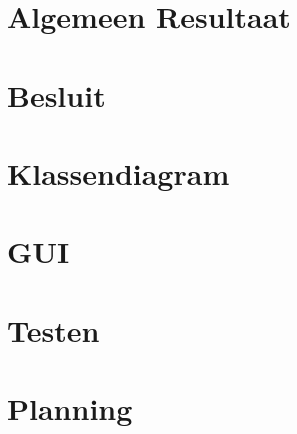 \documentclass[eind]{penoverslag}
\begin{document}
\section{Algemeen Resultaat}
\label{sec:AlgemeenResultaat}



\section*{Besluit}
\label{sec:Besluit}






\newpage\makeappendix

\section{Klassendiagram}
\label{App: AppendixKlassendiagram}

\newpage
\section{GUI}
\label{App: AppendixGUI}

\newpage
\section{Testen}
\label{App: AppendixTesten}

\section{Planning}
\label{App: AppendixPlanning}

%
\end{document}
